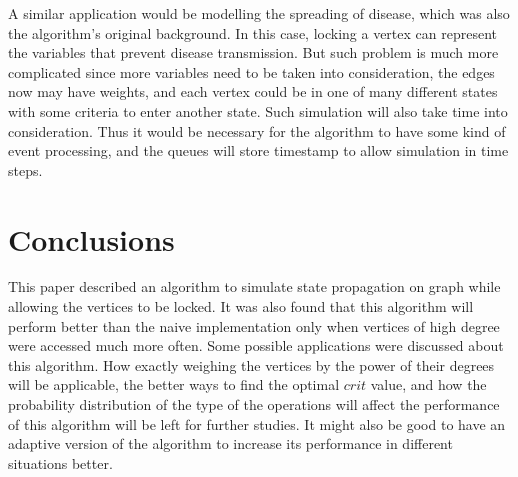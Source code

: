 \documentclass[12pt]{report}
\begin{document}
A similar application would be modelling the spreading of disease, which was also the algorithm's original background.\cite{aay21}
In this case, locking a vertex can represent the variables that prevent disease transmission.
But such problem is much more complicated since more variables need to be taken into consideration,
the edges now may have weights, and each vertex could be in one of many different states with some criteria to enter another state.
Such simulation will also take time into consideration.
Thus it would be necessary for the algorithm to have some kind of event processing,
and the queues will store timestamp to allow simulation in time steps.

\pagebreak

\chapter{Conclusions}

This paper described an algorithm to simulate state propagation on graph while allowing the vertices to be locked.
It was also found that this algorithm will perform better than the naive implementation only when vertices of high degree were accessed much more often.
Some possible applications were discussed about this algorithm.
How exactly weighing the vertices by the power of their degrees will be applicable,
the better ways to find the optimal $ \mathit{crit} $ value,
and how the probability distribution of the type of the operations will affect the performance of this algorithm will be left for further studies.
It might also be good to have an adaptive version of the algorithm to increase its performance in different situations better.

\pagebreak
\end{document}
